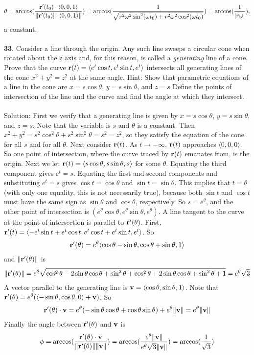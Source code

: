 \documentclass[12pt]{amsbook}
\newcommand{\la}{\langle}
\newcommand{\ra}{\rangle}
\begin{document}
$$\theta=\arccos(\frac{{\bf r}'(t_0)\cdot\la 0,0,1 \ra}{\|{\bf r}'(t_0)\|\|\la 0,0,1 \ra\|})=\arccos(\frac{1}{\sqrt{r^2\omega^2\sin^2(\omega t_0)+r^2\omega^2\cos^2(\omega t_0)}})=\arccos(\frac{1}{
|r\omega|}),$$
a constant.
\\
\\
{\small\bf 33}. Consider a line through the origin. Any such line sweeps a circular cone
when rotated about the z axis and, for this reason, is called a {\it generating} line of a cone. Prove that the curve ${\bf r}(t)=\la e^t\cos t, e^t\sin t, e^t \ra$ intersects all generating lines of the cone $x^2+y^2=z^2$ at the same angle. Hint: Show
that parametric equations of a line in the cone are $x=s\cos \theta$, $y=s\sin \theta$, and $z=s$ Define the points of intersection of the line and the curve and find the angle at which they intersect. 
\\
\\
{\sc Solution}: First we verify that a generating line is given by $x=s\cos \theta$, $y=s\sin \theta$, and $z=s$. Note that the variable is $s$ and $\theta$ is a constant. Then $x^2+y^2=s^2\cos^2\theta+s^2\sin^2\theta=s^2=z^2$, so they satisfy the equation of the cone for all $s$ and for all $\theta$. Next consider ${\bf r}(t)$. As $t \rightarrow -\infty$, ${\bf r}(t)$ approaches $\la 0,0,0 \ra$. So one point of intersection, where the curve traced by ${\bf r}(t)$ emanates from, is the origin. Next we let ${\bf r}(t)=\la s\cos\theta, s\sin \theta, s \ra$ for some $\theta$. Equating the third component gives $e^t=s$. Equating the first and second components and substituting $e^t=s$ gives $\cos t=\cos\theta$ and $\sin t=\sin\theta$. This implies that $t=\theta$ (with only one equality, this is not necessarily true), because both $\sin t$ and $\cos t$ must have the same sign as $\sin \theta$ and $\cos \theta$, respectively. So $s=e^{\theta}$, and the other point of intersection is $(e^{\theta}\cos \theta, e^{\theta}\sin \theta, e^{\theta})$. A line tangent to the curve at the point of intersection is parallel to ${\bf r}'(\theta)$. First, ${\bf r}'(t)=\la -e^t\sin t + e^t\cos t, e^t\cos t+e^t\sin t, e^t\ra$. So 
$${\bf r}'(\theta)=e^{\theta}\la \cos \theta -\sin \theta, \cos \theta +\sin \theta, 1 \ra$$
and $\|{\bf r}'(\theta)\|$ is
$$\|{\bf r}'(\theta)\|=e^{\theta}\sqrt{\cos^2\theta-2\sin \theta \cos \theta +\sin^2\theta+\cos^2\theta +2\sin\theta\cos\theta+\sin^2\theta+1}=e^{\theta}\sqrt{3}$$
A vector parallel to the generating line is ${\bf v}=\la \cos \theta, \sin \theta, 1 \ra$. Note that ${\bf r}'(\theta)=e^{\theta}(\la -\sin \theta, \cos \theta, 0 \ra + {\bf v})$. So
$${\bf r}'(\theta)\cdot {\bf v}=e^{\theta}(-\sin \theta \cos \theta+\cos \theta \sin \theta)+e^{\theta}\|{\bf v}\|=e^{\theta}\|{\bf v}\|$$ 
Finally the angle between ${\bf r}'(\theta)$ and ${\bf v}$ is
$$\phi=\arccos(\frac{{\bf r}'(\theta)\cdot{\bf v}}{\|{\bf r}'(\theta)\|\|{\bf v}\|})=\arccos(\frac{e^{\theta}\|{\bf v}\|}{e^{\theta}\sqrt{3}\|{\bf v}\|})=\arccos(\frac{1}{\sqrt{3}})$$
\end{document}
